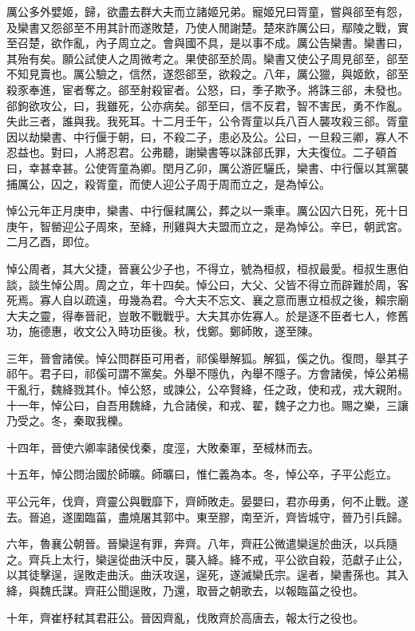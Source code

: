 厲公多外嬖姬，歸，欲盡去群大夫而立諸姬兄弟。寵姬兄曰胥童，嘗與郤至有怨，及欒書又怨郤至不用其計而遂敗楚，乃使人閒謝楚。楚來詐厲公曰，鄢陵之戰，實至召楚，欲作亂，內子周立之。會與國不具，是以事不成。厲公告欒書。欒書曰，其殆有矣。願公試使人之周微考之。果使郤至於周。欒書又使公子周見郤至，郤至不知見賣也。厲公驗之，信然，遂怨郤至，欲殺之。八年，厲公獵，與姬飲，郤至殺豕奉進，宦者奪之。郤至射殺宦者。公怒，曰，季子欺予。將誅三郤，未發也。郤鉤欲攻公，曰，我雖死，公亦病矣。郤至曰，信不反君，智不害民，勇不作亂。失此三者，誰與我。我死耳。十二月壬午，公令胥童以兵八百人襲攻殺三郤。胥童因以劫欒書、中行偃于朝，曰，不殺二子，患必及公。公曰，一旦殺三卿，寡人不忍益也。對曰，人將忍君。公弗聽，謝欒書等以誅郤氏罪，大夫復位。二子頓首曰，幸甚幸甚。公使胥童為卿。閏月乙卯，厲公游匠驪氏，欒書、中行偃以其黨襲捕厲公，囚之，殺胥童，而使人迎公子周于周而立之，是為悼公。

悼公元年正月庚申，欒書、中行偃弒厲公，葬之以一乘車。厲公囚六日死，死十日庚午，智罃迎公子周來，至絳，刑雞與大夫盟而立之，是為悼公。辛巳，朝武宮。二月乙酉，即位。

悼公周者，其大父捷，晉襄公少子也，不得立，號為桓叔，桓叔最愛。桓叔生惠伯談，談生悼公周。周之立，年十四矣。悼公曰，大父、父皆不得立而辟難於周，客死焉。寡人自以疏遠，毋幾為君。今大夫不忘文、襄之意而惠立桓叔之後，賴宗廟大夫之靈，得奉晉祀，豈敢不戰戰乎。大夫其亦佐寡人。於是逐不臣者七人，修舊功，施德惠，收文公入時功臣後。秋，伐鄭。鄭師敗，遂至陳。

三年，晉會諸侯。悼公問群臣可用者，祁傒舉解狐。解狐，傒之仇。復問，舉其子祁午。君子曰，祁傒可謂不黨矣。外舉不隱仇，內舉不隱子。方會諸侯，悼公弟楊干亂行，魏絳戮其仆。悼公怒，或諫公，公卒賢絳，任之政，使和戎，戎大親附。十一年，悼公曰，自吾用魏絳，九合諸侯，和戎、翟，魏子之力也。賜之樂，三讓乃受之。冬，秦取我櫟。

十四年，晉使六卿率諸侯伐秦，度涇，大敗秦軍，至棫林而去。

十五年，悼公問治國於師曠。師曠曰，惟仁義為本。冬，悼公卒，子平公彪立。

平公元年，伐齊，齊靈公與戰靡下，齊師敗走。晏嬰曰，君亦毋勇，何不止戰。遂去。晉追，遂圍臨菑，盡燒屠其郭中。東至膠，南至沂，齊皆城守，晉乃引兵歸。

六年，魯襄公朝晉。晉欒逞有罪，奔齊。八年，齊莊公微遣欒逞於曲沃，以兵隨之。齊兵上太行，欒逞從曲沃中反，襲入絳。絳不戒，平公欲自殺，范獻子止公，以其徒擊逞，逞敗走曲沃。曲沃攻逞，逞死，遂滅欒氏宗。逞者，欒書孫也。其入絳，與魏氏謀。齊莊公聞逞敗，乃還，取晉之朝歌去，以報臨菑之役也。

十年，齊崔杼弒其君莊公。晉因齊亂，伐敗齊於高唐去，報太行之役也。

